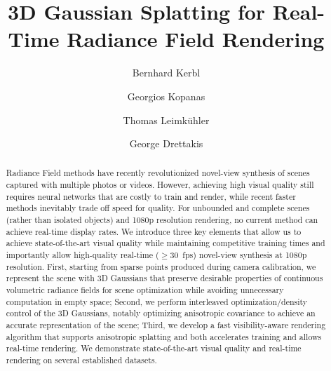 \documentclass[acmtog]{acmart}
\begin{document}
\title{3D Gaussian Splatting for Real-Time Radiance Field Rendering}


\author{Bernhard Kerbl}
\author{Georgios Kopanas}
\authornotemark[1]
\author{Thomas Leimk\"{u}hler}
\author{George Drettakis}

\def\Dg{DG}



\newcommand{\ADDITION}[1]{#1}
\newcommand{\REMOVAL}[1]{}
\newcommand{\CORRECTION}[2]{#2}


\begin{abstract}
Radiance Field methods have recently revolutionized novel-view synthesis of scenes captured with multiple photos or videos. However, achieving high visual quality still requires neural networks that are costly to train and render, while recent faster methods inevitably trade off speed for quality. For unbounded and complete scenes (rather than isolated objects) and 1080p resolution rendering, no current method can achieve real-time display rates. We introduce three key elements that allow us to achieve state-of-the-art visual quality while maintaining competitive training times and importantly allow high-quality real-time ($\geq30$~fps) novel-view synthesis at 1080p resolution. First, starting from sparse points produced during camera calibration, we represent the scene with 3D Gaussians %
that preserve desirable properties of continuous volumetric radiance fields for scene optimization while avoiding unnecessary computation in empty space; Second, we perform interleaved optimization/density control of the 3D Gaussians, notably optimizing anisotropic covariance to achieve an accurate representation of the scene; Third, we develop a fast visibility-aware rendering algorithm that supports anisotropic splatting and both accelerates training and allows real-time rendering. We demonstrate state-of-the-art visual quality and real-time rendering on several established datasets.
\end{abstract}
\end{document}
